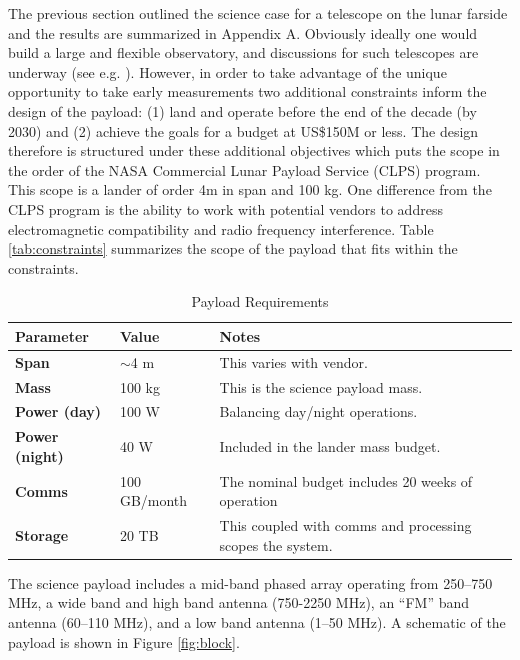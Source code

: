 The previous section outlined the science case for a telescope on the lunar farside and the results are summarized in Appendix A.  Obviously ideally one would build a large and flexible observatory, and discussions for such telescopes are underway (see e.g. ).  However, in order to take advantage of the unique opportunity to take early measurements two additional constraints inform the design of the payload: (1) land and operate before the end of the decade (by 2030) and (2) achieve the goals for a budget at US\$150M or less.  The design therefore is structured under these additional objectives which puts the scope in the order of the NASA Commercial Lunar Payload Service (CLPS) program.  This scope is a lander of order 4m in span and 100 kg.  One difference from the CLPS program is the ability to work with potential vendors to address electromagnetic compatibility and radio frequency interference.  Table \ref{tab:constraints} summarizes the scope of the payload that fits within the constraints.

\begin{table}
    \caption{Payload Requirements}
    \begin{tabular}{|l|l|l|} \hline
    \textbf{Parameter} & \textbf{Value} & \textbf{Notes} \\ \hline
    \textbf{Span} & $\sim$4 m & This varies with vendor. \\ \hline
    \textbf{Mass} & 100 kg & This is the science payload mass. \\ \hline
    \textbf{Power (day)} & 100 W & Balancing day/night operations. \\ \hline
    \textbf{Power (night)} & 40 W & Included in the lander mass budget. \\ \hline
    \textbf{Comms} & 100 GB/month & The nominal budget includes 20 weeks of operation \\ \hline
    \textbf{Storage} & 20 TB & This coupled with comms and processing scopes the system. \\ \hline
    \end{tabular}
\end{table}

The science payload includes a mid-band phased array operating from 250--750 MHz, a wide band and high band antenna (750-2250 MHz), an ``FM'' band antenna (60--110 MHz), and a low band antenna (1--50 MHz). A schematic of the payload is shown in Figure \ref{fig:block}.

